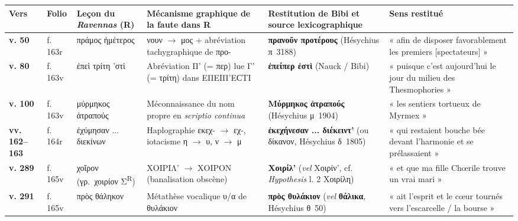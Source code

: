 \documentclass[11pt, a4paper, twoside]{article}
\renewcommand{\_}{\origunderscore\penalty0\relax}
\renewcommand{\texttt}[1]{#1}
\newcommand{\R}{\textbf{R}}
\newcommand{\Bibi}{\textit{Bibi}}
\def\R{R}%
\def\Bibi{Bibi}%
\begin{document}
{\small
\begin{longtable}{@{}>{\raggedright\arraybackslash}p{} >{\raggedright\arraybackslash}p{} >{\raggedright\arraybackslash}p{} >{\raggedright\arraybackslash}p{} >{\raggedright\arraybackslash}p{} >{\raggedright\arraybackslash}p{}@{}}
\toprule
\textbf{Vers} & \textbf{Folio} & \textbf{Leçon du \textit{Ravennas} (\R{})} & \textbf{Mécanisme graphique de la faute dans \R{}} & \textbf{Restitution de \Bibi{} et source lexicographique} & \textbf{Sens restitué} \\
\midrule
\endhead
\bottomrule
\endfoot
\textbf{v. 50} & \texttt{f. 163r} & \texttt{πράμος ἡμέτερος} & νουν $\to$ μος + abréviation tachygraphique de \texttt{προ-} & \textbf{\texttt{πρανοῦν προτέρους}} (Hésychius π~3188) & « afin de disposer favorablement les premiers [spectateurs] » \\
\addlinespace[3pt]
\textbf{v. 80} & \texttt{f. 163v} & \texttt{ἐπεὶ τρίτη 'στὶ} & Abréviation \texttt{Π'} (\texttt{= περ}) lue \texttt{Γ'} (\texttt{= τρίτη}) dans \texttt{ΕΠΕΙΠ'ΕϹΤΙ} & \textbf{\texttt{ἐπείπερ ἐστὶ}} (Nauck / \Bibi{}) & « puisque c'est aujourd'hui le jour du milieu des Thesmophories » \\
\addlinespace[3pt]
\textbf{v. 100} & \texttt{f. 163v} & \texttt{μύρμηκος ἀτραπούς} & Méconnaissance du nom propre en \textit{scriptio continua} & \textbf{\texttt{Μύρμηκος ἀτραπούς}} (Hésychius μ~1904) & « les sentiers tortueux de Myrmex » \\
\addlinespace[3pt]
\textbf{vv. 162–163} & \texttt{f. 164r} & \texttt{ἐχύμησαν ... διεκίνων} & Haplographie εκεχ- $\to$ εχ-, iotacisme η $\to$ υ, ν $\to$ μ & \textbf{\texttt{ἐκεχήνεσαν ... διέκειντ'}} (ou \texttt{δίκανον}, Hésychius δ~1805) & « qui restaient bouche bée devant l'harmonie et se prélassaient » \\
\addlinespace[3pt]
\textbf{v. 289} & \texttt{f. 165v} & \texttt{χοῖρον} (γρ.~χοιρίον Σ\textsuperscript{R}) & \texttt{ΧΟΙΡΙΛ'} $\to$ \texttt{ΧΟΙΡΟΝ} (banalisation obscène) & \textbf{\texttt{Χοιρίλ'}} (\textit{vel} \texttt{Χοιρίν'}, cf. \textit{Hypothesis} l. 2 \texttt{Χοιρίλη}) & « et que ma fille Chœrile trouve un vrai mari » \\
\addlinespace[3pt]
\textbf{v. 291} & \texttt{f. 165v} & \texttt{πρὸς θάληκον} & Métathèse vocalique υ/α de \texttt{θυλάκιον} & \textbf{\texttt{πρὸς θυλάκιον}} (\textit{vel} \textbf{\texttt{θάλικα}}, Hésychius θ~50) & « ait l'esprit et le cœur tournés vers l'escarcelle / la bourse » \\

\end{longtable}}
\end{document}
